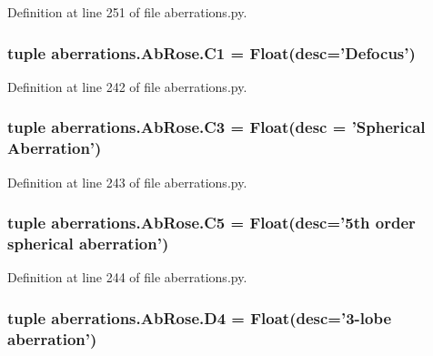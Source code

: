 Definition at line 251 of file aberrations.\-py.

\hypertarget{classaberrations_1_1_ab_rose_a3eabcef75216755b58bfe2a4c6cd9e11}{
\subsubsection[{C1}]{\setlength{\rightskip}{0pt plus 5cm}tuple aberrations.\-Ab\-Rose.\-C1 = Float(desc='{\bf Defocus}')\hspace{0.3cm}{\ttfamily [static]}}}\label{classaberrations_1_1_ab_rose_a3eabcef75216755b58bfe2a4c6cd9e11}


Definition at line 242 of file aberrations.\-py.

\hypertarget{classaberrations_1_1_ab_rose_ad37f4bbe1636b0edd67dcc9506cfba1b}{
\subsubsection[{C3}]{\setlength{\rightskip}{0pt plus 5cm}tuple aberrations.\-Ab\-Rose.\-C3 = Float(desc = 'Spherical Aberration')\hspace{0.3cm}{\ttfamily [static]}}}\label{classaberrations_1_1_ab_rose_ad37f4bbe1636b0edd67dcc9506cfba1b}


Definition at line 243 of file aberrations.\-py.

\hypertarget{classaberrations_1_1_ab_rose_a1ecc27f1334f14ce7cde2d79a965db13}{
\subsubsection[{C5}]{\setlength{\rightskip}{0pt plus 5cm}tuple aberrations.\-Ab\-Rose.\-C5 = Float(desc='5th order spherical aberration')\hspace{0.3cm}{\ttfamily [static]}}}\label{classaberrations_1_1_ab_rose_a1ecc27f1334f14ce7cde2d79a965db13}


Definition at line 244 of file aberrations.\-py.

\hypertarget{classaberrations_1_1_ab_rose_a1d4d0384c503620e8d84cf1cf6a5be3e}{
\subsubsection[{D4}]{\setlength{\rightskip}{0pt plus 5cm}tuple aberrations.\-Ab\-Rose.\-D4 = Float(desc='3-\/lobe {\bf aberration}')\hspace{0.3cm}{\ttfamily [static]}}}\label{classaberrations_1_1_ab_rose_a1d4d0384c503620e8d84cf1cf6a5be3e}


